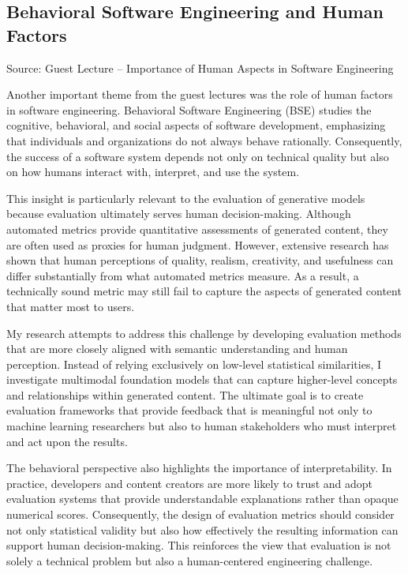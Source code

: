 \documentclass{article}
\begin{document}
\subsection{Behavioral Software Engineering and Human Factors}

Source: Guest Lecture -- Importance of Human Aspects in Software Engineering

Another important theme from the guest lectures was the role of human factors in software engineering. Behavioral Software Engineering (BSE) studies the cognitive, behavioral, and social aspects of software development, emphasizing that individuals and organizations do not always behave rationally. Consequently, the success of a software system depends not only on technical quality but also on how humans interact with, interpret, and use the system.

This insight is particularly relevant to the evaluation of generative models because evaluation ultimately serves human decision-making. Although automated metrics provide quantitative assessments of generated content, they are often used as proxies for human judgment. However, extensive research has shown that human perceptions of quality, realism, creativity, and usefulness can differ substantially from what automated metrics measure. As a result, a technically sound metric may still fail to capture the aspects of generated content that matter most to users.

My research attempts to address this challenge by developing evaluation methods that are more closely aligned with semantic understanding and human perception. Instead of relying exclusively on low-level statistical similarities, I investigate multimodal foundation models that can capture higher-level concepts and relationships within generated content. The ultimate goal is to create evaluation frameworks that provide feedback that is meaningful not only to machine learning researchers but also to human stakeholders who must interpret and act upon the results.

The behavioral perspective also highlights the importance of interpretability. In practice, developers and content creators are more likely to trust and adopt evaluation systems that provide understandable explanations rather than opaque numerical scores. Consequently, the design of evaluation metrics should consider not only statistical validity but also how effectively the resulting information can support human decision-making. This reinforces the view that evaluation is not solely a technical problem but also a human-centered engineering challenge.
\end{document}
